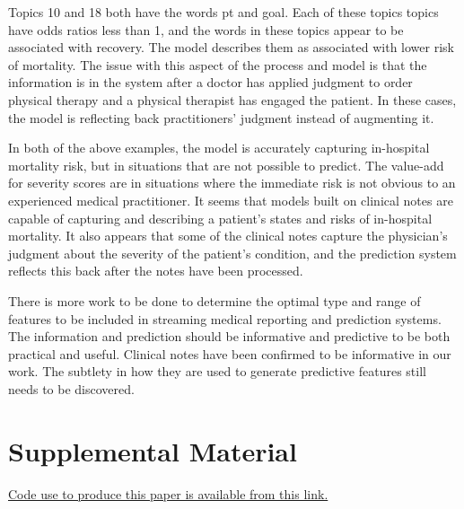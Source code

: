 \documentclass[journal]{IEEEtran}
\begin{document}
Topics 10 and 18 both have the words pt and goal.  Each of these topics topics have odds ratios less than 1, and the words in these topics appear to be associated with recovery.  The model describes them as associated with lower risk of mortality.   The issue with this aspect of the process and model is that the information is in the system after a doctor has applied judgment to order physical therapy and a physical therapist has engaged the patient.   In these cases, the model is reflecting back practitioners' judgment instead of augmenting it.

In both of the above examples, the model is accurately capturing in-hospital mortality risk, but in situations that are not possible to predict.  The value-add for severity scores are in situations where the immediate risk is not obvious to an experienced medical practitioner.  It seems that models built on clinical notes are capable of capturing and describing a patient's states and risks of in-hospital mortality.  It also appears that some of the clinical notes capture the physician's judgment about the severity of the patient's condition, and the prediction system reflects this back after the notes have been processed.

There is more work to be done to determine the optimal type and range of features to be included in streaming medical reporting and prediction systems.   The information and prediction should be informative and predictive to be both practical and useful.  Clinical notes have been confirmed to be informative in our work.  The subtlety in how they are used to generate predictive features still needs to be discovered.



\section{Supplemental Material}
\href{https://drive.google.com/folderview?id=0B-7SehP6iq_ybVM4aDgzQUh0Tnc&usp=sharing}{Code use to produce this paper is available from this link.}
\end{document}
